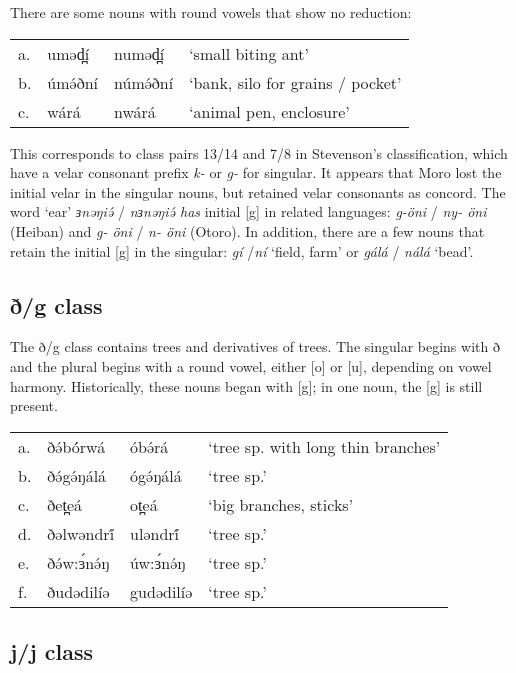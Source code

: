 There are some nouns with round vowels that show no reduction:

\ea
\begin{tabular}[t]{llll}
a.	&	uməd̪í	&	numəd̪í	&	‘small biting ant’\\
b.	&	úmə́ðní	&	númə́ðní	&	‘bank, silo for grains / pocket’\\
c.	&	wárá	&	nwárá	&	‘animal pen, enclosure’	\\
\end{tabular}
\z

This corresponds to class pairs 13/14 and 7/8 in Stevenson’s classification, which have a velar consonant prefix \textit{k-} or \textit{g-} for singular. It appears that Moro lost the initial velar in the singular nouns, but retained velar consonants as concord. The word ‘ear’ \textit{ɜnəŋiə́ }/ \textit{nɜnəŋiə́ has} initial [g] in related languages: \textit{g-öni} / \textit{ny- öni} (Heiban) and \textit{g- öni} / \textit{n- öni} (Otoro). In addition, there are a few nouns that retain the initial [g] in the singular: \textit{gí} /\textit{ní} ‘field, farm’ or \textit{gálá} / \textit{nálá} ‘bead’. 


\subsection{ð/g class}

The ð/g class contains trees and derivatives of trees. The singular begins with ð and the plural begins with a round vowel, either [o] or [u], depending on vowel harmony. Historically, these nouns began with [g]; in one noun, the [g] is still present. 

\ea
\begin{tabular}[t]{llll}
a.	&	ðə́bó́rwá		&	óbə́rá		&	‘tree sp. with long thin branches’\\
b.	&	ðə́gə́ŋálá		&	ógə́ŋálá	&	‘tree sp.’\\
c.	&	ðet̪eá		&	ot̪eá	&	‘big branches, sticks’\\
d.	&	ðəlwəndrí́	&	uləndrí́	&	‘tree sp.’\\
e.	&	ðə́w:ɜ́nə́ŋ		&	úw:ɜ́nə́ŋ	&	‘tree sp.’\\
f.	&	ðudədilíə	&	gudədilíə&	‘tree sp.’	\\
\end{tabular}
\z

\subsection{j/j class}

